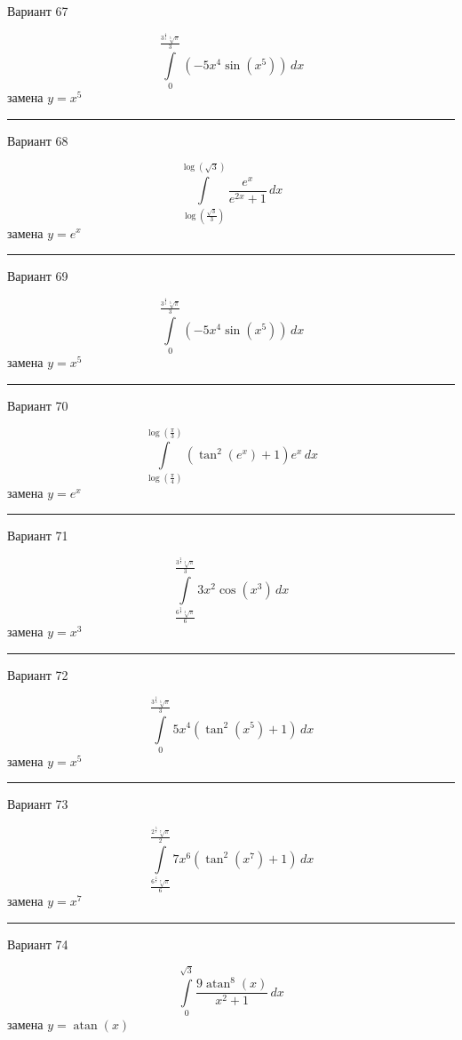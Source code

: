 \documentclass[11pt]{report}
\begin{document}
Вариант 67

$$\int\limits_{0}^{\frac{3^{\frac{4}{5}} \sqrt[5]{\pi}}{3}} \left(- 5 x^{4} \sin{\left(x^{5} \right)}\right)\, dx$$
замена $y = x^{5}$



\rule{\textwidth}{.2mm}

Вариант 68

$$\int\limits_{\log{\left(\frac{\sqrt{3}}{3} \right)}}^{\log{\left(\sqrt{3} \right)}} \frac{e^{x}}{e^{2 x} + 1}\, dx$$
замена $y = e^{x}$



\rule{\textwidth}{.2mm}

Вариант 69

$$\int\limits_{0}^{\frac{3^{\frac{4}{5}} \sqrt[5]{\pi}}{3}} \left(- 5 x^{4} \sin{\left(x^{5} \right)}\right)\, dx$$
замена $y = x^{5}$



\rule{\textwidth}{.2mm}

Вариант 70

$$\int\limits_{\log{\left(\frac{\pi}{4} \right)}}^{\log{\left(\frac{\pi}{3} \right)}} \left(\tan^{2}{\left(e^{x} \right)} + 1\right) e^{x}\, dx$$
замена $y = e^{x}$



\rule{\textwidth}{.2mm}

Вариант 71

$$\int\limits_{\frac{6^{\frac{2}{3}} \sqrt[3]{\pi}}{6}}^{\frac{3^{\frac{2}{3}} \sqrt[3]{\pi}}{3}} 3 x^{2} \cos{\left(x^{3} \right)}\, dx$$
замена $y = x^{3}$



\rule{\textwidth}{.2mm}

Вариант 72

$$\int\limits_{0}^{\frac{3^{\frac{4}{5}} \sqrt[5]{\pi}}{3}} 5 x^{4} \left(\tan^{2}{\left(x^{5} \right)} + 1\right)\, dx$$
замена $y = x^{5}$



\rule{\textwidth}{.2mm}

Вариант 73

$$\int\limits_{\frac{6^{\frac{6}{7}} \sqrt[7]{\pi}}{6}}^{\frac{2^{\frac{5}{7}} \sqrt[7]{\pi}}{2}} 7 x^{6} \left(\tan^{2}{\left(x^{7} \right)} + 1\right)\, dx$$
замена $y = x^{7}$



\rule{\textwidth}{.2mm}

Вариант 74

$$\int\limits_{0}^{\sqrt{3}} \frac{9 \operatorname{atan}^{8}{\left(x \right)}}{x^{2} + 1}\, dx$$
замена $y = \operatorname{atan}{\left(x \right)}$
\end{document}
